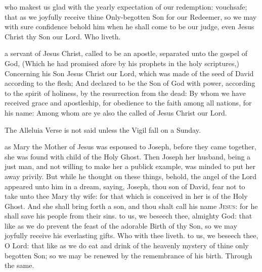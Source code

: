 \collect
{} who makest us glad with the yearly expectation of our redemption: vouchsafe; that as we joyfully receive thine Only-begotten Son for our Redeemer, so we may with sure confidence behold him when he shall come to be our judge, even Jesus Christ thy Son our Lord. Who liveth.

 a servant of Jesus Christ, called to be an apostle, separated unto the gospel of God, (Which he had promised afore by his prophets in the holy scriptures,) Concerning his Son Jesus Christ our Lord, which was made of the seed of David according to the flesh; And declared to be the Son of God with power, according to the spirit of holiness, by the resurrection from the dead: By whom we have received grace and apostleship, for obedience to the faith among all nations, for his name: Among whom are ye also the called of Jesus Christ our Lord.

\begin{rubric}
The Alleluia Verse is not said unless the Vigil fall on a Sunday.
\end{rubric}
 as Mary the Mother of Jesus was espoused to Joseph, before they came together, she was found with child of the Holy Ghost. Then Joseph her husband, being a just man, and not willing to make her a publick example, was minded to put her away privily. But while he thought on these things, behold, the angel of the Lord appeared unto him in a dream, saying, Joseph, thou son of David, fear not to take unto thee Mary thy wife: for that which is conceived in her is of the Holy Ghost. And she shall bring forth a son, and thou shalt call his name \textsc{Jesus}: for he shall save his people from their sins.
\secret
{} to us, we beseech thee, almighty God: that like as we do prevent the feast of the adorable Birth of thy Son, so we may joyfully receive his everlasting gifts. Who with thee liveth.
\postcommunion
{} to us, we beseech thee, O Lord: that like as we do eat and drink of the heavenly mystery of thine only begotten Son; so we may be renewed by the remembrance of his birth. Through the same.


